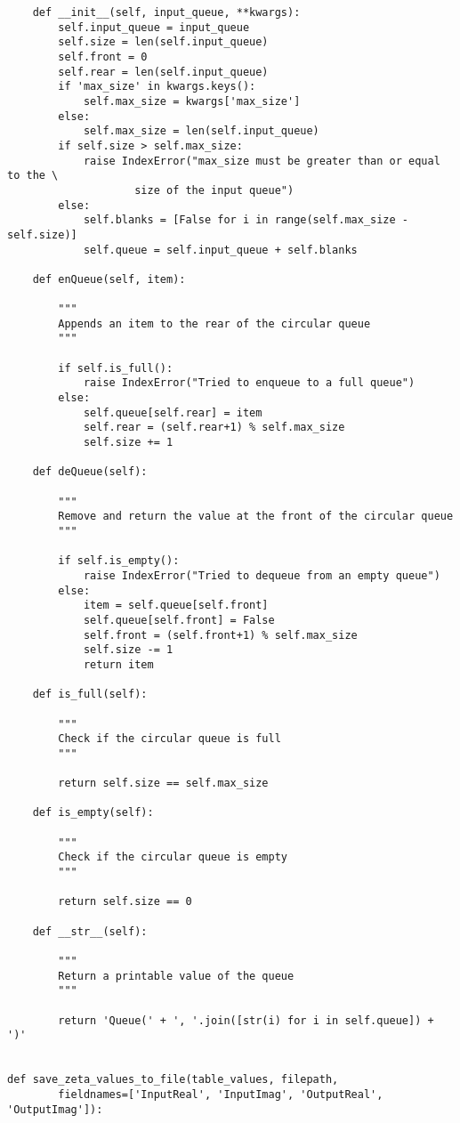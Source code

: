 \documentclass{article}
\begin{document}
\begin{lstlisting}
    def __init__(self, input_queue, **kwargs):
        self.input_queue = input_queue
        self.size = len(self.input_queue)
        self.front = 0
        self.rear = len(self.input_queue)
        if 'max_size' in kwargs.keys():
            self.max_size = kwargs['max_size']
        else:
            self.max_size = len(self.input_queue)
        if self.size > self.max_size:
            raise IndexError("max_size must be greater than or equal to the \
                    size of the input queue")
        else:
            self.blanks = [False for i in range(self.max_size - self.size)]
            self.queue = self.input_queue + self.blanks

    def enQueue(self, item):

        """
        Appends an item to the rear of the circular queue
        """

        if self.is_full():
            raise IndexError("Tried to enqueue to a full queue")
        else:
            self.queue[self.rear] = item
            self.rear = (self.rear+1) % self.max_size
            self.size += 1

    def deQueue(self):

        """
        Remove and return the value at the front of the circular queue
        """

        if self.is_empty():
            raise IndexError("Tried to dequeue from an empty queue")
        else:
            item = self.queue[self.front]
            self.queue[self.front] = False
            self.front = (self.front+1) % self.max_size
            self.size -= 1
            return item

    def is_full(self):

        """
        Check if the circular queue is full
        """

        return self.size == self.max_size

    def is_empty(self):

        """
        Check if the circular queue is empty
        """

        return self.size == 0

    def __str__(self):

        """
        Return a printable value of the queue
        """

        return 'Queue(' + ', '.join([str(i) for i in self.queue]) + ')'


def save_zeta_values_to_file(table_values, filepath,
        fieldnames=['InputReal', 'InputImag', 'OutputReal', 'OutputImag']):


\end{lstlisting}
\end{document}
